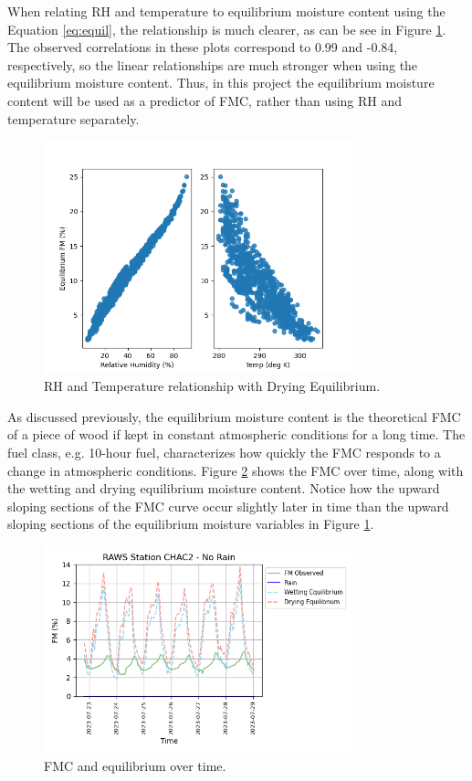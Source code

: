 \documentclass[11pt]{article}%
\begin{document}
When relating RH and temperature to equilibrium moisture content using the Equation \ref{eq:equil}, the relationship is much clearer, as can be see in Figure \ref{fig:eq_rh_temp_plot}. The observed correlations in these plots correspond to 0.99 and -0.84, respectively, so the linear relationships are much stronger when using the equilibrium moisture content. Thus, in this project the equilibrium moisture content will be used as a predictor of FMC, rather than using RH and temperature separately.

\begin{figure}[ht]
    \centering
    \includegraphics[width=0.8\textwidth]{images/eq_rh_temp_plot.png}
    \caption{RH and Temperature relationship with Drying Equilibrium.}
    \label{fig:eq_rh_temp_plot}
\end{figure}

As discussed previously, the equilibrium moisture content is the theoretical FMC of a piece of wood if kept in constant atmospheric conditions for a long time. The fuel class, e.g. 10-hour fuel, characterizes how quickly the FMC responds to a change in atmospheric conditions. Figure \ref{fig:eq_plot} shows the FMC over time, along with the wetting and drying equilibrium moisture content. Notice how the upward sloping sections of the FMC curve occur slightly later in time than the upward sloping sections of the equilibrium moisture variables in Figure \ref{fig:eq_rh_temp_plot}. 

\begin{figure}[ht]
    \centering
    \includegraphics[width=0.8\textwidth]{images/eq_plot.png}
    \caption{FMC and equilibrium over time.}
    \label{fig:eq_plot}
\end{figure}
\end{document}
